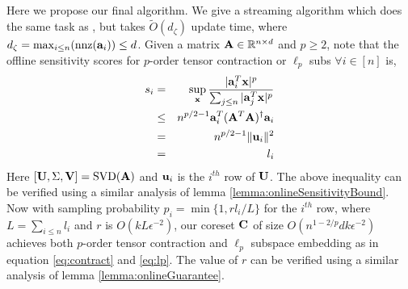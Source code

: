 \subsection{\mrlf}{\label{sec:streaminglf}}
Here we propose our final algorithm. We give a streaming algorithm which does the same task as \online, but takes $\tilde{O}(d_{\zeta})$ update time, where $d_{\zeta} = \max_{i\leq n}(\mbox{nnz}(\mathbf{a}_{i})) \leq d$. Given a matrix $\mathbf{A} \in \mathbb{R}^{n \times d}$ and $p \geq 2$, note that the offline sensitivity scores for $p$-order tensor contraction or $\ell_{p}$ subs $\forall i \in [n]$ is,
\begin{eqnarray*}
s_{i} &=& \sup_{\mathbf{x}} \frac{|\mathbf{a}_{i}^{T}\mathbf{x}|^{p}}{\sum_{j\leq n} |\mathbf{a}_{j}^{T}\mathbf{x}|^{p}} \\
&\leq& n^{p/2-1} \mathbf{a}_{i}^{T}(\mathbf{A}^{T}\mathbf{A})^{\dagger}\mathbf{a}_{i} \\
&=& n^{p/2-1}\|\mathbf{u}_{i}\|^{2} \\
&=& l_{i}
\end{eqnarray*}
Here $[\mathbf{U},\Sigma,\mathbf{V}] = \mbox{SVD}(\mathbf{A})$ and $\mathbf{u}_{i}$ is the $i^{th}$ row of $\mathbf{U}$. The above inequality can be verified using a similar analysis of lemma \ref{lemma:onlineSensitivityBound}. Now with sampling probability $p_{i} = \min\{1,rl_{i}/L\}$ for the $i^{th}$ row, where $L = \sum_{i\leq n} l_{i}$ and $r$ is $O(kL\epsilon^{-2})$, our coreset $\mathbf{C}$ of size $O(n^{1-2/p}dk\epsilon^{-2})$ achieves both $p$-order tensor contraction and $\ell_{p}$ subspace embedding as in equation \eqref{eq:contract} and \eqref{eq:lp}. The value of $r$ can be verified using a similar analysis of lemma \ref{lemma:onlineGuarantee}.

